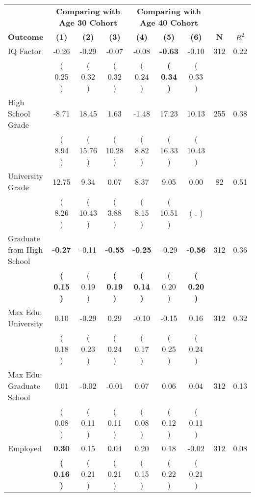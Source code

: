 \begin{tabular}{lcccccccc}
\toprule
 & \multicolumn{3}{c}{\textbf{Comparing with Age 30 Cohort}} & \multicolumn{3}{c}{\textbf{Comparing with Age 40 Cohort}} & \\
\cmidrule(lr){2-4} \cmidrule(lr){5-7} 
 \textbf{Outcome} & \textbf{(1)} & \textbf{(2)} & \textbf{(3)} & \textbf{(4)} & \textbf{(5)} & \textbf{(6)} & \textbf{N} & \textbf{$ R^2$} \\
\midrule
IQ Factor &     -0.26 &     -0.29 &     -0.07 &     -0.08 & \textbf{    -0.63} &     -0.10 & 312 &       0.22 \\ 
 & (     0.25 ) & (     0.32 ) & (     0.32 ) & (     0.24 ) & \textbf{(     0.34 )} & (     0.33 ) & \\
High School Grade &     -8.71 &     18.45 &      1.63 &     -1.48 &     17.23 &     10.13 & 255 &       0.38 \\ 
 & (     8.94 ) & (    15.76 ) & (    10.28 ) & (     8.82 ) & (    16.33 ) & (    10.43 ) & \\
University Grade &     12.75 &      9.34 &      0.07 &      8.37 &      9.05 &      0.00 & 82 &       0.51 \\ 
 & (     8.26 ) & (    10.43 ) & (     3.88 ) & (     8.15 ) & (    10.51 ) & (        . ) & \\
Graduate from High School & \textbf{    -0.27} &     -0.11 & \textbf{    -0.55} & \textbf{    -0.25} &     -0.29 & \textbf{    -0.56} & 312 &       0.36 \\ 
 & \textbf{(     0.15 )} & (     0.19 ) & \textbf{(     0.19 )} & \textbf{(     0.14 )} & (     0.20 ) & \textbf{(     0.20 )} & \\
Max Edu: University &      0.10 &     -0.29 &      0.29 &     -0.10 &     -0.15 &      0.16 & 312 &       0.32 \\ 
 & (     0.18 ) & (     0.23 ) & (     0.24 ) & (     0.17 ) & (     0.25 ) & (     0.24 ) & \\
Max Edu: Graduate School &      0.01 &     -0.02 &     -0.01 &      0.07 &      0.06 &      0.04 & 312 &       0.13 \\ 
 & (     0.08 ) & (     0.11 ) & (     0.11 ) & (     0.08 ) & (     0.12 ) & (     0.11 ) & \\
Employed & \textbf{     0.30} &      0.15 &      0.04 &      0.20 &      0.18 &     -0.02 & 312 &       0.08 \\ 
 & \textbf{(     0.16 )} & (     0.21 ) & (     0.21 ) & (     0.15 ) & (     0.22 ) & (     0.21 ) & \\

\end{tabular}
